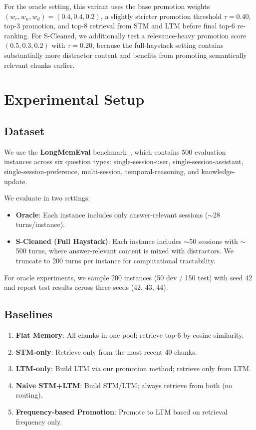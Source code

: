 \documentclass{article}
\begin{document}
For the oracle setting, this variant uses the base promotion weights $(w_r, w_u, w_d)=(0.4,0.4,0.2)$, a slightly stricter promotion threshold $\tau=0.40$, top-3 promotion, and top-8 retrieval from STM and LTM before final top-6 re-ranking. For S-Cleaned, we additionally test a relevance-heavy promotion score $(0.5,0.3,0.2)$ with $\tau=0.20$, because the full-haystack setting contains substantially more distractor content and benefits from promoting semantically relevant chunks earlier.

\section{Experimental Setup}

\subsection{Dataset}

We use the \textbf{LongMemEval} benchmark~\cite{longmemeval}, which contains 500 evaluation instances across six question types: single-session-user, single-session-assistant, single-session-preference, multi-session, temporal-reasoning, and knowledge-update.

We evaluate in two settings:
\begin{itemize}
    \item \textbf{Oracle}: Each instance includes only answer-relevant sessions ($\sim$28 turns/instance).
    \item \textbf{S-Cleaned (Full Haystack)}: Each instance includes $\sim$50 sessions with $\sim$500 turns, where answer-relevant content is mixed with distractors. We truncate to 200 turns per instance for computational tractability.
\end{itemize}

For oracle experiments, we sample 200 instances (50 dev / 150 test) with seed 42 and report test results across three seeds (42, 43, 44).

\subsection{Baselines}

\begin{enumerate}
    \item \textbf{Flat Memory}: All chunks in one pool; retrieve top-6 by cosine similarity.
    \item \textbf{STM-only}: Retrieve only from the most recent 40 chunks.
    \item \textbf{LTM-only}: Build LTM via our promotion method; retrieve only from LTM.
    \item \textbf{Naive STM+LTM}: Build STM/LTM; always retrieve from both (no routing).
    \item \textbf{Frequency-based Promotion}: Promote to LTM based on retrieval frequency only.
\end{enumerate}
\end{document}

